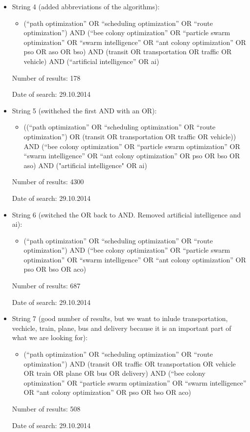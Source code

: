 \begin{itemize}
\item String 4 (added abbreviations of the algorithms):
\begin{itemize}
\item (``path optimization'' OR ``scheduling optimization'' OR ``route optimization'') AND (``bee colony optimization'' OR ``particle swarm optimization'' OR ``swarm intelligence'' OR ``ant colony optimization'' OR pso OR aso OR bso) AND (transit OR transportation OR traffic OR vehicle) AND (``artificial intelligence'' OR ai) 
\end{itemize}
\par Number of results: 178
\par Date of search: 29.10.2014

\item String 5 (swithched the first AND with an OR):
\begin{itemize}
\item((``path optimization'' OR ``scheduling optimization'' OR ``route optimization'') OR (transit OR transportation OR traffic OR vehicle)) AND (``bee colony optimization'' OR ``particle swarm optimization'' OR ``swarm intelligence'' OR ``ant colony optimization'' OR pso OR bso OR aso)  AND ("artificial intelligence" OR ai)
\end{itemize}
\par Number of results: 4300
\par Date of search: 29.10.2014

\item String 6 (switched the OR back to AND. Removed artificial intelligence and ai):
\begin{itemize}
\item(``path optimization'' OR ``scheduling optimization'' OR ``route optimization'') AND (``bee colony optimization'' OR ``particle swarm optimization'' OR ``swarm intelligence'' OR ``ant colony optimization'' OR pso OR bso OR aco) 
\end{itemize}
\par Number of results: 687
\par Date of search: 29.10.2014

\item String 7 (good number of results, but we want to inlude transportation, vechicle, train, plane, bus and delivery because it is an important part of what we are looking for):
\begin{itemize}
\item(``path optimization'' OR ``scheduling optimization'' OR ``route optimization'') AND (transit OR traffic OR transportation OR vehicle OR train OR plane OR bus OR delivery) AND (``bee colony optimization'' OR ``particle swarm optimization'' OR ``swarm intelligence'' OR ``ant colony optimization'' OR pso OR bso OR aco)
\end{itemize} 
\par Number of results: 508
\par Date of search: 29.10.2014

\end{itemize}

